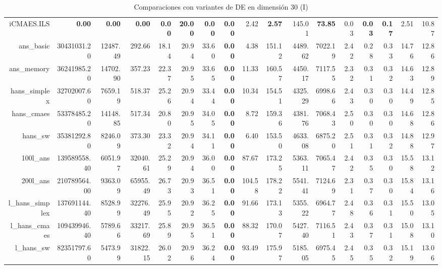 \begin{table}[h!]
\begin{tabular}{rrrrrrrrrrrrrrrrr}
  iCMAES.ILS & \textbf{0.00} & \textbf{0.00} & \textbf{0.00} & \textbf{0.00} & \textbf{20.00} & \textbf{0.00} & \textbf{0.00} & 2.42 & \textbf{2.57} & 145.01 & \textbf{73.85} & 0.03 & \textbf{0.03} & \textbf{0.17} & 2.51 & 10.87 \\ 
  ans\_basic & 30431031.20 & 12487.49 & 292.66 & 18.14 & 20.94 & 33.60 & \textbf{0.00} & 4.38 & 151.12 & 4489.62 & 7022.19 & 2.42 & 0.28 & 0.33 & 14.76 & 12.86 \\ 
  ans\_memory & 36241985.20 & 14702.90 & 357.23 & 22.37 & 20.95 & 33.65 & \textbf{0.00} & 11.33 & 160.57 & 4450.17 & 7117.55 & 2.32 & 0.31 & 0.32 & 14.63 & 12.89 \\ 
  hans\_simplex & 32702007.60 & 7659.19 & 518.37 & 25.26 & 20.94 & 33.44 & \textbf{0.00} & 10.34 & 154.51 & 4325.29 & 6998.66 & 2.43 & 0.30 & 0.30 & 14.49 & 12.85 \\ 
  hans\_cmaes & 53378485.20 & 14148.85 & 517.34 & 20.80 & 20.95 & 34.05 & \textbf{0.00} & 8.72 & 159.36 & 4381.76 & 7068.43 & 2.50 & 0.30 & 0.30 & 14.68 & 12.86 \\ 
  hans\_sw & 35381292.80 & 8246.09 & 373.30 & 23.32 & 20.94 & 34.11 & \textbf{0.00} & 6.40 & 153.50 & 4633.08 & 6875.20 & 2.51 & 0.31 & 0.32 & 14.88 & 12.97 \\ 
  100l\_ans & 139589558.40 & 6051.97 & 32040.61 & 25.29 & 20.94 & 36.00 & \textbf{0.00} & 87.67 & 173.25 & 5363.11 & 7065.47 & 2.42 & 0.35 & 0.30 & 15.58 & 13.12 \\ 
  200l\_ans & 210789564.00 & 9363.09 & 65955.49 & 26.73 & 20.93 & 36.51 & \textbf{0.00} & 104.58 & 178.22 & 5541.41 & 7124.69 & 2.31 & 0.37 & 0.30 & 15.84 & 13.16 \\ 
  l\_hans\_simplex & 137691144.40 & 8528.99 & 32276.49 & 25.95 & 20.92 & 36.25 & \textbf{0.00} & 91.66 & 173.13 & 5355.22 & 6964.77 & 2.48 & 0.36 & 0.31 & 15.50 & 13.05 \\ 
  l\_hans\_cmaes & 109439946.40 & 5789.66 & 33217.69 & 25.89 & 20.95 & 36.51 & \textbf{0.00} & 88.32 & 170.07 & 5427.40 & 7116.51 & 2.43 & 0.37 & 0.31 & 15.08 & 13.10 \\ 
  l\_hans\_sw & 82351797.60 & 5473.99 & 31822.15 & 26.02 & 20.96 & 36.24 & \textbf{0.00} & 93.49 & 175.97 & 5185.05 & 6975.45 & 2.45 & 0.35 & 0.32 & 15.19 & 13.06 \\ 
   \hline
\end{tabular}
\endgroup
\caption{Comparaciones con variantes de DE en dimensión 30 (I)} 
\label{complete30a}
\end{table}
